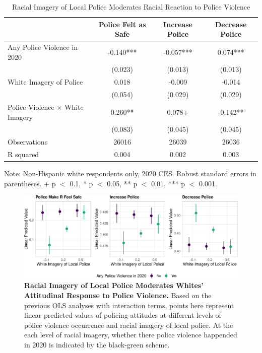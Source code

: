 \documentclass[
  12pt,
]{article}
\begin{document}
\hypertarget{tbl-reaction}{}
\begin{table}
\caption{\label{tbl-reaction}Racial Imagery of Local Police Moderates Racial Reaction to Police
Violence }\tabularnewline

\centering
\begin{threeparttable}
\begin{tabular}[t]{lccc}
\toprule
  & Police Felt as Safe & Increase Police & Decrease Police\\
\midrule
Any Police Violence in 2020 & -0.140*** & -0.057*** & 0.074***\\
 & (0.023) & (0.013) & (0.013)\\
White Imagery of Police & 0.018 & -0.009 & -0.014\\
 & (0.054) & (0.029) & (0.029)\\
Police Violence × White Imagery & 0.260** & 0.078+ & -0.142**\\
 & (0.083) & (0.045) & (0.045)\\
\midrule
Observations & 26016 & 26039 & 26036\\
R squared & 0.004 & 0.002 & 0.003\\
\bottomrule
\end{tabular}
\begin{tablenotes}
\item Note: Non-Hispanic white respondents only, 2020 CES. Robust standard errors in parentheses. + p $<$ 0.1, * p $<$ 0.05, ** p $<$ 0.01, *** p $<$ 0.001.
\end{tablenotes}
\end{threeparttable}
\end{table}

\begin{figure}[t]

{\centering \includegraphics{racialized-police_files/figure-pdf/fig-reaction-mod-1.pdf}

}

\caption{\label{fig-reaction-mod}\textbf{Racial Imagery of Local Police
Moderates Whites' Attitudinal Response to Police Violence.} Based on the
previous OLS analyses with interaction terms, points here represent
linear predicted values of policing attitudes at different levels of
police violence occurrence and racial imagery of local police. At the
each level of racial imagery, whether there police violence happended in
2020 is indicated by the black-green scheme.}

\end{figure}
\end{document}
